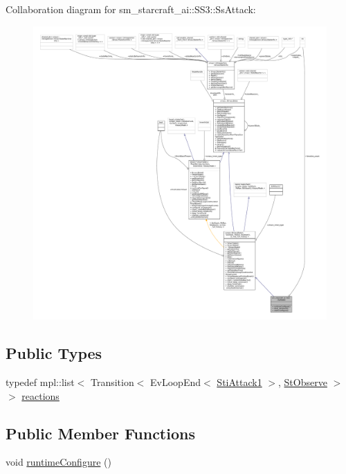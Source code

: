 Collaboration diagram for sm\+\_\+starcraft\+\_\+ai\+:\+:S\+S3\+:\+:Ss\+Attack\+:
\nopagebreak
\begin{figure}[H]
\begin{center}
\leavevmode
\includegraphics[width=350pt]{structsm__starcraft__ai_1_1SS3_1_1SsAttack__coll__graph}
\end{center}
\end{figure}
\subsection*{Public Types}
\begin{DoxyCompactItemize}
\item 
typedef mpl\+::list$<$ Transition$<$ Ev\+Loop\+End$<$ \hyperlink{structsm__starcraft__ai_1_1attack__inner__states_1_1StiAttack1}{Sti\+Attack1} $>$, \hyperlink{structsm__starcraft__ai_1_1StObserve}{St\+Observe} $>$ $>$ \hyperlink{structsm__starcraft__ai_1_1SS3_1_1SsAttack_a3b31f484f8db42bd131288e2616a1006}{reactions}
\end{DoxyCompactItemize}
\subsection*{Public Member Functions}
\begin{DoxyCompactItemize}
\item 
void \hyperlink{structsm__starcraft__ai_1_1SS3_1_1SsAttack_a71bd7fb927c3078017c8ba632d7aa013}{runtime\+Configure} ()
\end{DoxyCompactItemize}
